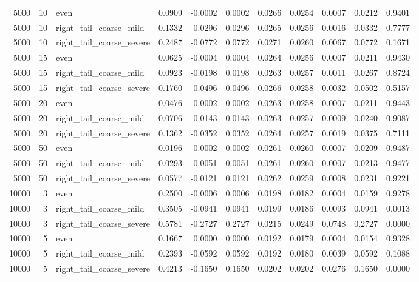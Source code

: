 \begin{table}[!h]
{\begin{tabular}[t]{rrlrrrrrrrr}
5000 & 10 & even & 0.0909 & -0.0002 & 0.0002 & 0.0266 & 0.0254 & 0.0007 & 0.0212 & 0.9401\\
5000 & 10 & right\_tail\_coarse\_mild & 0.1332 & -0.0296 & 0.0296 & 0.0265 & 0.0256 & 0.0016 & 0.0332 & 0.7777\\
5000 & 10 & right\_tail\_coarse\_severe & 0.2487 & -0.0772 & 0.0772 & 0.0271 & 0.0260 & 0.0067 & 0.0772 & 0.1671\\
5000 & 15 & even & 0.0625 & -0.0004 & 0.0004 & 0.0264 & 0.0256 & 0.0007 & 0.0211 & 0.9430\\
5000 & 15 & right\_tail\_coarse\_mild & 0.0923 & -0.0198 & 0.0198 & 0.0263 & 0.0257 & 0.0011 & 0.0267 & 0.8724\\
5000 & 15 & right\_tail\_coarse\_severe & 0.1760 & -0.0496 & 0.0496 & 0.0266 & 0.0258 & 0.0032 & 0.0502 & 0.5157\\
5000 & 20 & even & 0.0476 & -0.0002 & 0.0002 & 0.0263 & 0.0258 & 0.0007 & 0.0211 & 0.9443\\
5000 & 20 & right\_tail\_coarse\_mild & 0.0706 & -0.0143 & 0.0143 & 0.0263 & 0.0257 & 0.0009 & 0.0240 & 0.9087\\
5000 & 20 & right\_tail\_coarse\_severe & 0.1362 & -0.0352 & 0.0352 & 0.0264 & 0.0257 & 0.0019 & 0.0375 & 0.7111\\
5000 & 50 & even & 0.0196 & -0.0002 & 0.0002 & 0.0261 & 0.0260 & 0.0007 & 0.0209 & 0.9487\\
5000 & 50 & right\_tail\_coarse\_mild & 0.0293 & -0.0051 & 0.0051 & 0.0261 & 0.0260 & 0.0007 & 0.0213 & 0.9477\\
5000 & 50 & right\_tail\_coarse\_severe & 0.0577 & -0.0121 & 0.0121 & 0.0262 & 0.0259 & 0.0008 & 0.0231 & 0.9221\\
10000 & 3 & even & 0.2500 & -0.0006 & 0.0006 & 0.0198 & 0.0182 & 0.0004 & 0.0159 & 0.9278\\
10000 & 3 & right\_tail\_coarse\_mild & 0.3505 & -0.0941 & 0.0941 & 0.0199 & 0.0186 & 0.0093 & 0.0941 & 0.0013\\
10000 & 3 & right\_tail\_coarse\_severe & 0.5781 & -0.2727 & 0.2727 & 0.0215 & 0.0249 & 0.0748 & 0.2727 & 0.0000\\
10000 & 5 & even & 0.1667 & 0.0000 & 0.0000 & 0.0192 & 0.0179 & 0.0004 & 0.0154 & 0.9328\\
10000 & 5 & right\_tail\_coarse\_mild & 0.2393 & -0.0592 & 0.0592 & 0.0192 & 0.0180 & 0.0039 & 0.0592 & 0.1088\\
10000 & 5 & right\_tail\_coarse\_severe & 0.4213 & -0.1650 & 0.1650 & 0.0202 & 0.0202 & 0.0276 & 0.1650 & 0.0000\\

\end{tabular}}
\end{table}
